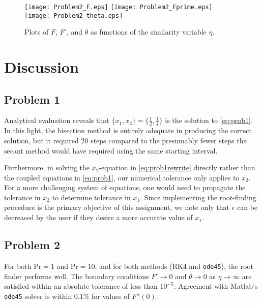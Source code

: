 \documentclass[12pt]{article}
\begin{document}
\begin{figure}[h!]
\begin{center}
\texttt{[image: Problem2\_F.eps]}
\texttt{[image: Problem2\_Fprime.eps]}
\texttt{[image: Problem2\_theta.eps]}
\\
\caption{Plots of $F$, $F'$, and $\theta$ as functions of the similarity variable $\eta$.}
\label{fig:prob2_plots}
\end{center}
\end{figure}

\section{Discussion} %

\subsection{Problem 1}

Analytical evaluation reveals that $\{ x_1, x_2 \} = \{ \tfrac{1}{2}, \tfrac{1}{4} \}$ is the solution to \eqref{eq:prob1}. In this light, the bisection method is entirely adequate in producing the correct solution, but it required 20 steps compared to the presumably fewer steps the secant method would have required using the same starting interval.

Furthermore, in solving the $x_2$-equation in \eqref{eq:prob1rewrite} directly rather than the coupled equations in \eqref{eq:prob1}, our numerical tolerance only applies to $x_2$. For a more challenging system of equations, one would need to propagate the tolerance in $x_2$ to determine tolerance in $x_1$. Since implementing the root-finding procedure is the primary objective of this assignment, we note only that $\epsilon$ can be decreased by the user if they desire a more accurate value of $x_1$.

\subsection{Problem 2}

For both $\text{Pr} = 1$ and $\text{Pr} = 10$, and for both methods (RK4 and \lstinline|ode45|), the root finder performs well. The boundary conditions $F' \rightarrow 0$ and $\theta \rightarrow 0$ as $\eta \rightarrow \infty$ are satisfied within an absolute tolerance of less than $10^{-5}$. Agreement with Matlab's \lstinline|ode45| solver is within 0.1\% for values of $F''(0)$.
\end{document}
